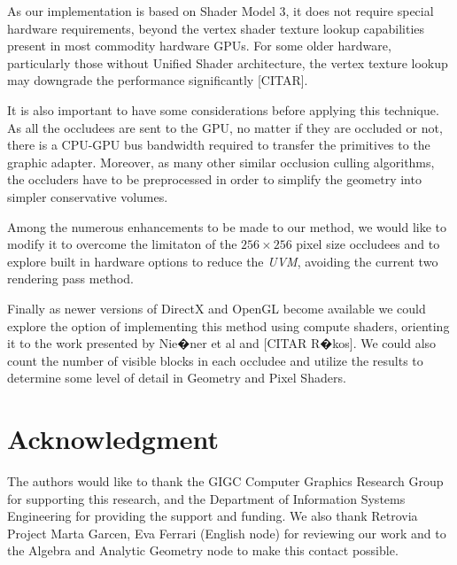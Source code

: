 \documentclass[10pt, conference]{IEEEtran}
\begin{document}
As our implementation is based on Shader Model 3, it does not require special hardware requirements, beyond the vertex shader texture lookup 
capabilities present in most commodity hardware GPUs. 
For some older hardware, particularly those without Unified Shader architecture, the vertex texture lookup may downgrade the performance 
significantly [CITAR].\

It is also important to have some considerations before applying this technique. 
As all the occludees are sent to the GPU, no matter if they are occluded or not, there is a CPU-GPU bus bandwidth required to transfer the primitives to the graphic adapter.
Moreover, as many other similar occlusion culling algorithms, the occluders have to be preprocessed in order to simplify the geometry into simpler conservative volumes.\
 
Among the numerous enhancements to be made to our method, we would like to modify it to overcome the limitaton of the 
$256 \times 256$ pixel size occludees and to explore built in hardware options to reduce the \emph{UVM}, avoiding the current two rendering pass method.\

Finally as newer versions of DirectX and OpenGL become available we could explore the option of implementing this method using compute shaders, 
orienting it  to the work presented by Nie�ner et al \cite{occlusion_culling_tessellation} and [CITAR R�kos]. 
We could also count the number of visible blocks in each occludee and utilize the results to determine some level of detail in Geometry and Pixel Shaders.



\iffinal
\section*{Acknowledgment}
%
The authors would like to thank the GIGC Computer Graphics Research Group for supporting this research, and the Department of Information Systems 
Engineering for providing the support and funding. We also thank Retrovia Project Marta Garcen, Eva Ferrari (English node) for reviewing our work 
and to the Algebra and Analytic Geometry node to make this contact possible.
\fi




\end{document}
